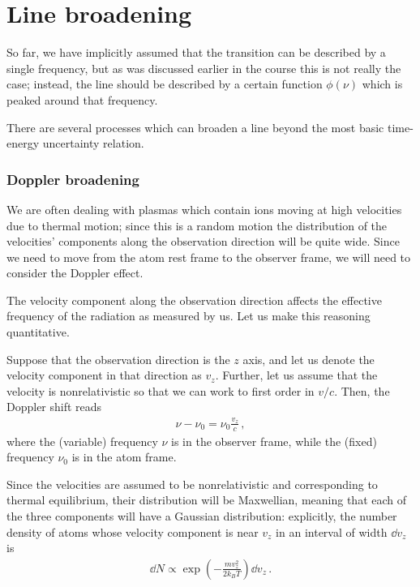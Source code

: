 \documentclass[main.tex]{subfiles}
\begin{document}
\section{Line broadening}

So far, we have implicitly assumed that the transition can be described by a single frequency, but as was discussed earlier in the course this is not really the case; instead, the line should be described by a certain function \(\phi (\nu )\) which is peaked around that frequency. 

There are several processes which can broaden a line beyond the most basic time-energy uncertainty relation. 

\subsubsection{Doppler broadening}

We are often dealing with plasmas which contain ions moving at high velocities due to thermal motion; since this is a random motion the distribution of the velocities' components along the observation direction will be quite wide. 
Since we need to move from the atom rest frame to the observer frame, we will need to consider the Doppler effect.

The velocity component along the observation direction affects the effective frequency of the radiation as measured by us. 
Let us make this reasoning quantitative. 

Suppose that the observation direction is the \(z\) axis, and let us denote the velocity component in that direction as \(v_z\). 
Further, let us assume that the velocity is nonrelativistic so that we can work to first order in \(v/c\). Then, the Doppler shift reads 
%
\begin{align}
\nu - \nu_0  = \nu_0 \frac{v_z}{c} 
\,,
\end{align}
%
where the (variable) frequency \(\nu \) is in the observer frame, while the (fixed) frequency \(\nu_0 \) is in the atom frame. 

Since the velocities are assumed to be nonrelativistic and corresponding to thermal equilibrium, their distribution will be Maxwellian, meaning that each of the three components will have a Gaussian distribution: explicitly, the number density of atoms whose velocity component is near \(v_z\) in an interval of width \(\dd{v_z}\) is 
%
\begin{align}
\dd{N} \propto \exp(- \frac{m v_z^2}{2 k_B T}) \dd{v_z}
\,.
\end{align}
\end{document}

